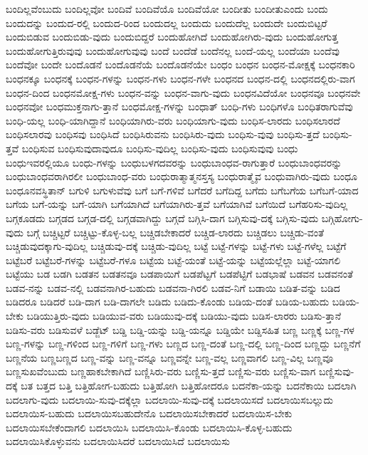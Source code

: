 {ಬಂದಿಲ್ಲವೆಂಬುದು
ಬಂದಿಲ್ಲವೋ
ಬಂದಿವೆ
ಬಂದಿವೆಯೊ
ಬಂದಿವೆಯೋ
ಬಂದೀತು
ಬಂದೀತುಎಂದು
ಬಂದು
ಬಂದುದನ್ನು
ಬಂದುದ-ರಲ್ಲಿ
ಬಂದುದ-ರಿಂದ
ಬಂದುದಲ್ಲ
ಬಂದುದು
ಬಂದುದೆಲ್ಲ
ಬಂದುದೇ
ಬಂದುಬಿಟ್ಟರೆ
ಬಂದುಬಿಡುವ
ಬಂದುಬಿಡು-ವುದು
ಬಂದುಬಿದ್ದರೆ
ಬಂದುಹೋಗಿದೆ
ಬಂದುಹೋಗಿರು-ವುದು
ಬಂದುಹೋಗುತ್ತ
ಬಂದುಹೋಗುತ್ತಿರುವುವು
ಬಂದುಹೋಗುವುವು
ಬಂದೆ
ಬಂದೆಡೆ
ಬಂದೆನಲ್ಲ
ಬಂದೆ-ಯಲ್ಲ
ಬಂದೆಯಾ
ಬಂದೆವು
ಬಂದೆವೋ
ಬಂದೇ
ಬಂದೊಡನೆ
ಬಂದೊಡನೆಯೆ
ಬಂದೊಡನೆಯೇ
ಬಂಧಂ
ಬಂಧನ
ಬಂಧನ-ಮೋಕ್ಷಕ್ಕೆ
ಬಂಧನಕಾರಿ
ಬಂಧನಕ್ಕೂ
ಬಂಧನಕ್ಕೆ
ಬಂಧನ-ಗಳನ್ನು
ಬಂಧನ-ಗಳು
ಬಂಧನ-ಗಳೇ
ಬಂಧನದ
ಬಂಧನ-ದಲ್ಲಿ
ಬಂಧನದಲ್ಲಿರು-ವಾಗ
ಬಂಧನ-ದಿಂದ
ಬಂಧನಮೋಕ್ಷ-ಗಳು
ಬಂಧನ-ವನ್ನು
ಬಂಧನ-ವಾಗು-ವುದು
ಬಂಧನವಿದೆಯೋ
ಬಂಧನವೂ
ಬಂಧನವೇ
ಬಂಧನವೋ
ಬಂಧಮುಕ್ತನಾಗು-ತ್ತಾನೆ
ಬಂಧಮೋಕ್ಷ-ಗಳನ್ನು
ಬಂಧಾತ್
ಬಂಧಿ-ಗಳು
ಬಂಧಿಗಳೊ
ಬಂಧಿತರಾಗುವೆವು
ಬಂಧಿ-ಯಲ್ಲ
ಬಂಧಿ-ಯಾಗಿದ್ದಾನೆ
ಬಂಧಿಯಾಗಿರು-ವರು
ಬಂಧಿಯಾಗು-ವುದು
ಬಂಧಿಸ-ಲಾರದು
ಬಂಧಿಸಲಾರದೆ
ಬಂಧಿಸಲಾರವು
ಬಂಧಿಸವು
ಬಂಧಿಸಿದೆ
ಬಂಧಿಸಿರುವನು
ಬಂಧಿಸಿರು-ವುದು
ಬಂಧಿಸು-ವುವು
ಬಂಧಿಸು-ತ್ತದೆ
ಬಂಧಿಸು-ತ್ತವೆ
ಬಂಧಿಸುವ
ಬಂಧಿಸುವುದಾವುದೂ
ಬಂಧಿಸು-ವುದಿಲ್ಲ
ಬಂಧಿಸು-ವುದು
ಬಂಧಿಸುವುವು
ಬಂಧು
ಬಂಧುಇವರಲ್ಲಿಯೂ
ಬಂಧು-ಗಳನ್ನು
ಬಂಧುಬಳಗದವರನ್ನು
ಬಂಧುಬಾಂಧವ-ರಾಗುತ್ತಾರೆ
ಬಂಧುಬಾಂಧವರನ್ನು
ಬಂಧುಬಾಂಧವರಾಗಿರಲೀ
ಬಂಧುಬಾಂಧ-ವರು
ಬಂಧುರಾತ್ಮಾತ್ಮನಸ್ತಸ್ಯ
ಬಂಧುರಾತ್ಮೈವ
ಬಂಧುವಾಗಿರು-ವುದು
ಬಂಧೂ
ಬಂಧೂನವಸ್ಥಿತಾನ್
ಬಗುಳಿ
ಬಗುಳುವೆವು
ಬಗೆ
ಬಗೆ-ಗಳಿವೆ
ಬಗೆದರೆ
ಬಗೆದಿದ್ದ
ಬಗೆದು
ಬಗೆಬಗೆಯ
ಬಗೆಬಗೆ-ಯಾದ
ಬಗೆಯ
ಬಗೆ-ಯನ್ನು
ಬಗೆ-ಯಾಗಿ
ಬಗೆಯಾಗಿದೆ
ಬಗೆಯಾಗಿರು-ತ್ತವೆ
ಬಗೆಯಾಗಿವೆ
ಬಗೆಯಿದೆ
ಬಗೆಹರಿಸು-ವುದಿಲ್ಲ
ಬಗ್ಗಕೂಡದು
ಬಗ್ಗಡದ
ಬಗ್ಗಡ-ದಲ್ಲಿ
ಬಗ್ಗಡವಾಗಿದ್ದು
ಬಗ್ಗದೆ
ಬಗ್ಗಿಸಿ-ದಾಗ
ಬಗ್ಗಿಸುವು-ದಕ್ಕೆ
ಬಗ್ಗಿಸು-ವುದು
ಬಗ್ಗಿಹೋಗು-ವುದು
ಬಗ್ಗೆ
ಬಚ್ಚಿಟ್ಟರೆ
ಬಚ್ಚಿಟ್ಟು-ಕೊಳ್ಳ-ಬಲ್ಲ
ಬಚ್ಚಿಡಬೇಕಾದರೆ
ಬಚ್ಚಿಡ-ಲಾರದು
ಬಚ್ಚಿಡಲು
ಬಚ್ಚಿಡು-ವಂತೆ
ಬಚ್ಚಿಡುವುದಕ್ಕಾಗು-ವುದಿಲ್ಲ
ಬಚ್ಚಿಡುವು-ದಕ್ಕೆ
ಬಚ್ಚಿಡು-ವುದಿಲ್ಲ
ಬಟ್ಟೆ
ಬಟ್ಟೆ-ಗಳನ್ನು
ಬಟ್ಟೆ-ಗಳು
ಬಟ್ಟೆ-ಗಳೆಲ್ಲ
ಬಟ್ಟೆಗೆ
ಬಟ್ಟೆಬರೆ
ಬಟ್ಟೆಬರೆ-ಗಳನ್ನು
ಬಟ್ಟೆಬರೆ-ಗಳೂ
ಬಟ್ಟೆಯ
ಬಟ್ಟೆ-ಯಂತೆ
ಬಟ್ಟೆ-ಯನ್ನು
ಬಟ್ಟೆಯಲ್ಲೆಲ್ಲಾ
ಬಟ್ಟೆ-ಯಾಗಲಿ
ಬಟ್ಟೆಯು
ಬಡ
ಬಡಗಿ
ಬಡತನ
ಬಡತನವೂ
ಬಡಪಾಯಿಗೆ
ಬಡಪೆಟ್ಟಗೆ
ಬಡಪೆಟ್ಟಿಗೆ
ಬಡಭಾಷೆ
ಬಡವನ
ಬಡವನಂತೆ
ಬಡವ-ನನ್ನು
ಬಡವ-ನಲ್ಲಿ
ಬಡವನಾಗಿರ-ಬಹುದು
ಬಡವನಾ-ಗಿರಲಿ
ಬಡವ-ನಿಗೆ
ಬಡಾಯಿ
ಬಡಿತ-ವನ್ನು
ಬಡಿದ
ಬಡಿದರೂ
ಬಡಿದರೆ
ಬಡಿ-ದಾಗ
ಬಡಿ-ದಾಗಲೇ
ಬಡಿದು
ಬಡಿದು-ಕೊಂಡು
ಬಡಿಯ-ದಂತೆ
ಬಡಿಯ-ಬಹುದು
ಬಡಿಯ-ಬೇಕು
ಬಡಿಯುತ್ತಿರು-ವುದು
ಬಡಿಯುವ-ವರು
ಬಡಿಯುವು-ದಕ್ಕೆ
ಬಡಿಯು-ವುದು
ಬಡಿಸ-ಲಾರರು
ಬಡಿಸು-ತ್ತಾನೆ
ಬಡಿಸು-ವರು
ಬಡಿಸುವಳೆ
ಬಡ್ಜೆಟ್
ಬಡ್ಡಿ
ಬಡ್ಡಿ-ಯನ್ನು
ಬಡ್ಡಿ-ಯನ್ನೂ
ಬಡ್ಡಿಯೇ
ಬಡ್ಡಿಸಹಿತ
ಬಣ್ಣ
ಬಣ್ಣಕ್ಕೆ
ಬಣ್ಣ-ಗಳ
ಬಣ್ಣ-ಗಳನ್ನು
ಬಣ್ಣ-ಗಳಿಂದ
ಬಣ್ಣ-ಗಳಿಗೆ
ಬಣ್ಣ-ಗಳು
ಬಣ್ಣದ
ಬಣ್ಣ-ದಂತೆ
ಬಣ್ಣ-ದಲ್ಲಿ
ಬಣ್ಣ-ದಿಂದ
ಬಣ್ಣದ್ದು
ಬಣ್ಣನೆಗೆ
ಬಣ್ಣನೆಯ
ಬಣ್ಣಬಣ್ಣದ
ಬಣ್ಣ-ವನ್ನು
ಬಣ್ಣ-ವನ್ನೂ
ಬಣ್ಣವನ್ನೇ
ಬಣ್ಣ-ವಲ್ಲ
ಬಣ್ಣವಾಗಲಿ
ಬಣ್ಣ-ವಿಲ್ಲ
ಬಣ್ಣವೂ
ಬಣ್ಣಸುಖವೆಂಬುದು
ಬಣ್ಣಹಾಕಬೇಕಾಗಿದೆ
ಬಣ್ಣಿಸಿರು-ವರು
ಬಣ್ಣಿಸು-ತ್ತದೆ
ಬಣ್ಣಿಸು-ವರು
ಬಣ್ಣಿಸು-ವಾಗ
ಬಣ್ಣಿಸುವು-ದಕ್ಕೆ
ಬತ
ಬತ್ತದ
ಬತ್ತಿ
ಬತ್ತಿಹೋಗ-ಬಹುದು
ಬತ್ತಿಹೋಗಿ
ಬತ್ತಿಹೋದರೂ
ಬದನೆಕಾ-ಯನ್ನು
ಬದನೆಕಾಯಿ
ಬದಲಾಗಿ
ಬದಲಾಗು-ವುದು
ಬದಲಾಯಿ-ಸುವು-ದಕ್ಕೆಲ್ಲಾ
ಬದಲಾಯಿ-ಸುವು-ದಕ್ಕೆ
ಬದಲಾಯಿಸದೆ
ಬದಲಾಯಿಸಬಲ್ಲುದು
ಬದಲಾಯಿಸ-ಬಹುದು
ಬದಲಾಯಿಸಬಹುದೇನೊ
ಬದಲಾಯಿಸಬೇಕಾದರೆ
ಬದಲಾಯಿಸ-ಬೇಕು
ಬದಲಾಯಿಸಬೇಕೆಂದಾಗಲಿ
ಬದಲಾಯಿಸಿ
ಬದಲಾಯಿಸಿ-ಕೊಂಡು
ಬದಲಾಯಿಸಿ-ಕೊಳ್ಳ-ಬಹುದು
ಬದಲಾಯಿಸಿಕೊಳ್ಳುವನು
ಬದಲಾಯಿಸಿದರೆ
ಬದಲಾಯಿಸಿದೆ
ಬದಲಾಯಿಸು
}
